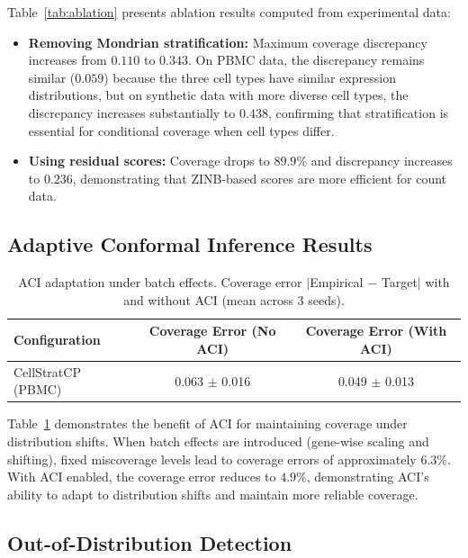 \documentclass{article}
\begin{document}
Table~\ref{tab:ablation} presents ablation results computed from experimental data:
\begin{itemize}
    \item \textbf{Removing Mondrian stratification:} Maximum coverage discrepancy increases from $0.110$ to $0.343$. On PBMC data, the discrepancy remains similar ($0.059$) because the three cell types have similar expression distributions, but on synthetic data with more diverse cell types, the discrepancy increases substantially to $0.438$, confirming that stratification is essential for conditional coverage when cell types differ.
    \item \textbf{Using residual scores:} Coverage drops to $89.9\%$ and discrepancy increases to $0.236$, demonstrating that ZINB-based scores are more efficient for count data.
\end{itemize}

\subsection{Adaptive Conformal Inference Results}

\begin{table}[t]
\caption{ACI adaptation under batch effects. Coverage error $|$Empirical $-$ Target$|$ with and without ACI (mean across 3 seeds).}
\label{tab:aci}
\centering
\begin{tabular}{lcc}
\toprule
Configuration & Coverage Error (No ACI) & Coverage Error (With ACI) \\
\midrule
CellStratCP (PBMC) & 0.063 $\pm$ 0.016 & 0.049 $\pm$ 0.013 \\
\bottomrule
\end{tabular}
\end{table}

Table~\ref{tab:aci} demonstrates the benefit of ACI for maintaining coverage under distribution shifts. When batch effects are introduced (gene-wise scaling and shifting), fixed miscoverage levels lead to coverage errors of approximately $6.3\%$. With ACI enabled, the coverage error reduces to $4.9\%$, demonstrating ACI's ability to adapt to distribution shifts and maintain more reliable coverage.

\subsection{Out-of-Distribution Detection}
\end{document}
